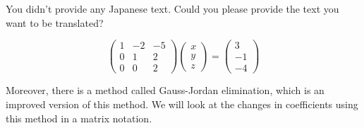\documentclass{ltjsbook}
\begin{document}
You didn't provide any Japanese text. Could you please provide the text you want to be translated?

\[
	\begin{pmatrix} 1 & -2 & -5 \\
                0 & 1  & 2  \\
                0 & 0  & 2\end{pmatrix}
	\begin{pmatrix} x \\ y \\ z \end{pmatrix}
	=
	\begin{pmatrix} 3 \\ -1 \\ -4 \end{pmatrix}
\]

Moreover, there is a method called Gauss-Jordan elimination, which is an improved version of this method. We will look at the changes in coefficients using this method in a matrix notation.
\end{document}
